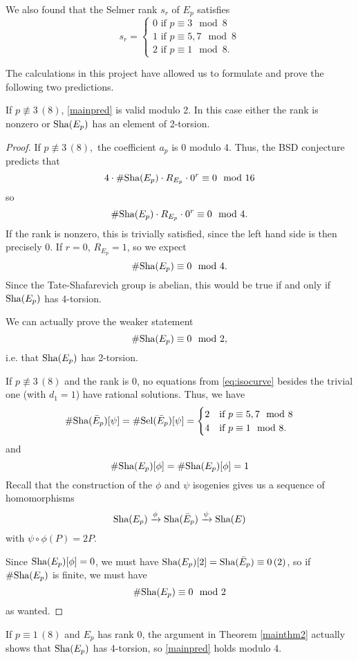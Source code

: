 \documentclass[12pt, a4paper]{amsart}
\begin{document}
We also found that the Selmer rank $s_r$ of
$E_p$ satisfies
\begin{equation*}
  s_r =
  \begin{cases}
    0 \text{ if } p \equiv 3 \mod{8} \\
    1 \text{ if } p \equiv 5,7 \mod{8} \\
    2 \text{ if } p \equiv 1 \mod{8}.
  \end{cases}
\end{equation*}

The calculations in this project have allowed us to formulate and prove the
following two predictions.


\begin{thm} \label{mainthm2}
  If $p \not\equiv 3 \, (8)$, \autoref{mainpred} is valid modulo 2. In
  this case either the rank is nonzero or $\text{\normalfont Sha}(E_p)$ has an element of 2-torsion.
\end{thm}
\begin{proof}
  If $p \not\equiv 3 \, (8),$ the coefficient $a_p$ is 0 modulo 4.
  Thus,
  the BSD conjecture predicts that
  \[4 \cdot \#\text{\normalfont Sha}(E_p) \cdot R_{E_p} \cdot 0^r \equiv 0 \mod{16}\]
  so
  \[\# \text{\normalfont Sha}(E_p) \cdot R_{E_p} \cdot 0^r \equiv 0 \mod{4}.\]
  If the rank is nonzero, this is trivially satisfied, since the left hand side
  is then precisely 0. If $r = 0$, $R_{E_p} = 1$, so we expect
  \[\# \text{\normalfont Sha}(E_p) \equiv 0 \mod{4}.\]
  Since the Tate-Shafarevich group is abelian, this would be true 
  if and only if $\text{\normalfont Sha}(E_p)$ has 4-torsion. 

  We can actually prove the weaker statement
  \[\# \text{\normalfont Sha}(E_p) \equiv 0 \mod{2},\]
  i.e. that $\text{\normalfont Sha}(E_p)$ has 2-torsion.
  
  If $p \not\equiv 3 \, (8)$ and the rank is 0, no equations from
  \ref{eq:isocurve} besides the trivial one (with $d_1 = 1$) have rational
  solutions. Thus, we have
  \[\# \text{\normalfont Sha}(\bar{E}_p)[\psi] = \# \text{\normalfont Sel}(\bar{E}_p)[\psi] =
    \begin{cases}
      2 &\text{if } p \equiv 5,7 \mod{8} \\
      4 &\text{if } p \equiv 1 \mod{8}.
    \end{cases}
  \]
  and
  \[\# \text{\normalfont Sha}(E_p)[\phi] = \# \text{\normalfont Sha}(E_p)[\phi] = 1\]
  Recall that the construction of the $\phi$ and $\psi$ isogenies gives us a
  sequence of homomorphisms
  \[\text{\normalfont Sha}(E_p) \xrightarrow{\phi} \text{\normalfont Sha}(\bar{E}_p) \xrightarrow{\psi} \text{\normalfont Sha}(E)\]
  with $\psi \circ \phi (P) = 2P.$

  Since $\text{\normalfont Sha}(E_p)[\phi] = 0$, we must have $\text{\normalfont Sha}(E_p)[2] = \text{\normalfont Sha}(\bar{E}_p)
  \equiv 0 \, (2)$, so if $\# \text{\normalfont Sha}(E_p)$ is finite, we must have
  \[\# \text{\normalfont Sha}(E_p) \equiv 0 \mod{2}\]
  as wanted.

\end{proof}
\begin{remark}
  If $p \equiv 1 \, (8)$ and $E_p$ has rank 0,
  the argument in Theorem \autoref{mainthm2} actually shows that $\text{\normalfont Sha}(E_p)$ has
  4-torsion, so \autoref{mainpred} holds modulo 4.
\end{remark}
\end{document}
